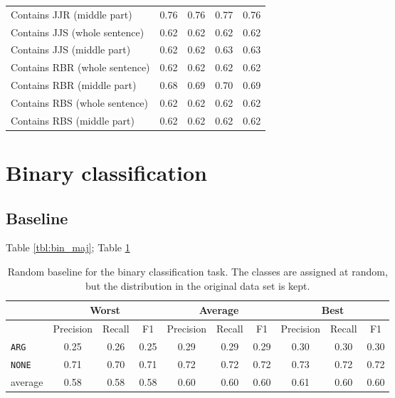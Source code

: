 \begin{table}[h]
\begin{tabularx}{\textwidth}{Xrrrr}
Contains JJR (middle part) &     0.76 &  0.76&   0.77&  0.76 \\ 
Contains JJS (whole sentence) &  0.62 &  0.62&   0.62&  0.62 \\ 
Contains JJS (middle part) &     0.62 &  0.62&   0.63&  0.63 \\ 
Contains RBR (whole sentence) &  0.62 &  0.62&   0.62&  0.62 \\ 
Contains RBR (middle part) &     0.68 &  0.69&   0.70&  0.69 \\ 
Contains RBS (whole sentence) &  0.62 &  0.62&   0.62&  0.62 \\ 
Contains RBS (middle part) &     0.62 &  0.62&   0.62&  0.62 \\ 
\bottomrule\end{tabularx}
\end{table}

\section{Binary classification}
\subsection{Baseline}

Table \ref{tbl:bin_maj}; Table \ref{tbl:bin_strat}

 \begin{table}[h]
                \centering
\caption{Random baseline for the binary classification task. The classes are assigned at random, but the distribution in the original data set is kept.}
\label{tbl:bin_strat}
 \begin{tabular}{@{}lccccccccc@{}}
              \toprule
               & \multicolumn{3}{c}{Worst} & \multicolumn{3}{c}{Average} & \multicolumn{3}{c}{Best}  \\ \midrule
               & Precision  & Recall & F1   & Precision  & Recall  & F1    & Precision & Recall & F1   \\ \toprule
\texttt{ARG}	 & 0.25	 & 0.26	 & 0.25	 &0.29	 & 0.29	 & 0.29	 &0.30	 & 0.30	 & 0.30	 \\ 
\texttt{NONE}	 & 0.71	 & 0.70	 & 0.71	 &0.72	 & 0.72	 & 0.72	 &0.73	 & 0.72	 & 0.72	 \\ \midrule 
average	 & 0.58	 & 0.58	 & 0.58	 &0.60	 & 0.60	 & 0.60	 &0.61	 & 0.60	 & 0.60	 \\ \bottomrule

    \end{tabular}
\end{table}

